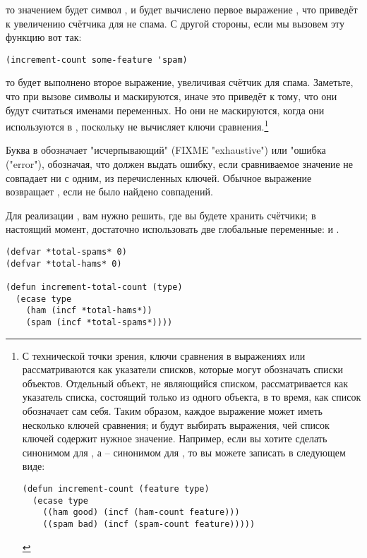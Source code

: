то значением  будет символ , и будет вычислено первое выражение
, что приведёт к увеличению счётчика для не спама. С другой стороны, если мы
вызовем эту функцию вот так:

\begin{lstlisting}
(increment-count some-feature 'spam)
\end{lstlisting}

то будет выполнено второе выражение, увеличивая счётчик для спама.  Заметьте, что при
вызове  символы  и  маскируются, иначе это
приведёт к тому, что они будут считаться именами переменных.  Но они не маскируются, когда
они используются в , поскольку  не вычисляет ключи
сравнения.\footnote{С технической точки зрения, ключи сравнения в выражениях 
  или  рассматриваются как указатели списков, которые могут обозначать списки
  объектов.  Отдельный объект, не являющийся списком, рассматривается как указатель
  списка, состоящий только из одного объекта, в то время, как список обозначает сам себя.
  Таким образом, каждое выражение может иметь несколько ключей сравнения;  и
   будут выбирать выражения, чей список ключей содержит нужное значение.
  Например, если вы хотите сделать  синонимом для , а  --
  синонимом для , то вы можете записать  в следующем
  виде:

\begin{lstlisting}
(defun increment-count (feature type)
  (ecase type
    ((ham good) (incf (ham-count feature)))
    ((spam bad) (incf (spam-count feature)))))
\end{lstlisting}

}

Буква  в  обозначает "исчерпывающий" (FIXME "exhaustive") или "ошибка
("error"), обозначая, что  должен выдать ошибку, если сравниваемое значение не
совпадает ни с одним, из перечисленных ключей.  Обычное выражение  возвращает
, если не было найдено совпадений.

Для реализации , вам нужно решить, где вы будете хранить
счётчики; в настоящий момент, достаточно использовать две глобальные переменные:
 и .

\begin{lstlisting}
(defvar *total-spams* 0)
(defvar *total-hams* 0)

(defun increment-total-count (type)
  (ecase type
    (ham (incf *total-hams*))
    (spam (incf *total-spams*))))
\end{lstlisting}

